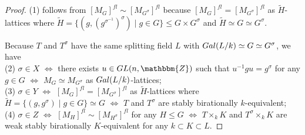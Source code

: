 \documentclass[10pt,a4paper]{amsart}
\newcommand{\bZ}{\mathbbm{Z}}\newcommand{\bQ}{\mathbbm{Q}}
\begin{document}
\begin{proof}
(1) follows from 
$[M_G]^{fl}\sim [M_{G^\sigma}]^{fl}$ 
because 
$[M_G]^{fl}=[M_{G^\sigma}]^{fl}$ 
as $\widetilde{H}$-lattices where 
$\widetilde{H}=\{(g,(g^{\sigma^{-1}})^{\sigma})\mid 
g\in G\}\leq G\times G^\sigma$ and $\widetilde{H}\simeq G\simeq G^\sigma$. 

Because $T$ and $T^\sigma$ have the same splitting field $L$ 
with ${\rm Gal}(L/k)\simeq G\simeq G^\sigma$, 
we have\\
(2) $\sigma\in X$
$\Leftrightarrow$ 
there exists $u\in {\rm GL}(n,\bZ)$ such that 
$u^{-1}gu=g^\sigma$ for any $g\in G$ 
$\Leftrightarrow$ 
$M_G\simeq M_{G^\sigma}$ as ${\rm Gal}(L/k)$-lattices;\\
(3) 
$\sigma\in Y$
$\Leftrightarrow$ 
$[M_G]^{fl}=[M_{G^\sigma}]^{fl}$ as 
$\widetilde{H}$-lattices where 
$\widetilde{H}=\{(g,g^\sigma)\mid g\in G\}\simeq G$ 
$\Leftrightarrow$ 
$T$ and $T^\sigma$ are stably birationally $k$-equivalent;\\
(4) 
$\sigma\in Z$
$\Leftrightarrow$ 
$[M_H]^{fl}\sim [M_{H^\sigma}]^{fl}$ for any 
$H\leq G$ 
$\Leftrightarrow$ 
$T\times_k K$ and $T^\sigma\times_k K$ 
are weak stably birationally $K$-equivalent 
for any $k\subset K\subset L$. 
\end{proof}
\end{document}
